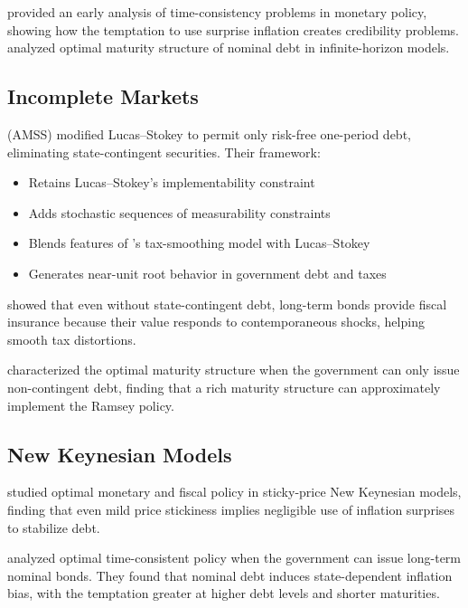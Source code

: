 \documentclass[12pt]{article}
\begin{document}
\citet{calvo_1978} provided an early analysis of time-consistency problems in monetary policy, showing how the temptation to use surprise inflation creates credibility problems. \citet{calvo_guidotti_1992} analyzed optimal maturity structure of nominal debt in infinite-horizon models.

\subsection{Incomplete Markets}

\citet{aiyagari_marcet_sargent_seppala_2002} (AMSS) modified Lucas--Stokey to permit only risk-free one-period debt, eliminating state-contingent securities. Their framework:
\begin{itemize}[noitemsep]
\item Retains Lucas--Stokey's implementability constraint
\item Adds stochastic sequences of measurability constraints
\item Blends features of \citet{barro_1979}'s tax-smoothing model with Lucas--Stokey
\item Generates near-unit root behavior in government debt and taxes
\end{itemize}

\citet{angeletos_2002} showed that even without state-contingent debt, long-term bonds provide fiscal insurance because their value responds to contemporaneous shocks, helping smooth tax distortions.

\citet{buera_nicolini_2004} characterized the optimal maturity structure when the government can only issue non-contingent debt, finding that a rich maturity structure can approximately implement the Ramsey policy.

\subsection{New Keynesian Models}

\citet{schmitt_grohe_uribe_2004} studied optimal monetary and fiscal policy in sticky-price New Keynesian models, finding that even mild price stickiness implies negligible use of inflation surprises to stabilize debt.

\citet{leeper_leith_liu_2020} analyzed optimal time-consistent policy when the government can issue long-term nominal bonds. They found that nominal debt induces state-dependent inflation bias, with the temptation greater at higher debt levels and shorter maturities.
\end{document}
